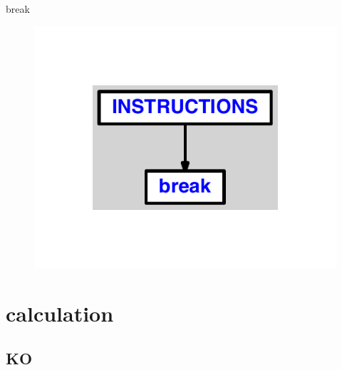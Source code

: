 \documentclass{article}
\begin{document}
\begin{verbatimtab}

break
\end{verbatimtab}
\begin{figure}[H]\centering\includegraphics[max width=\textwidth]{ast/ast_21.pdf}\end{figure}\section{calculation}
\subsection{KO}
\end{document}
